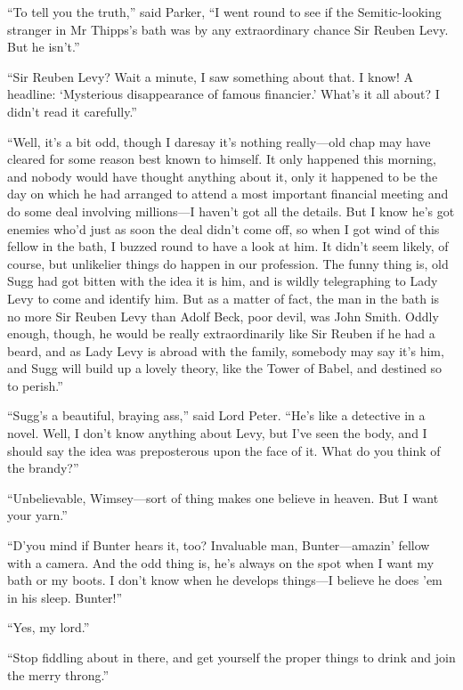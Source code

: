 \enquote{To tell you the truth,} said Parker, \enquote{I went round to see if the Semitic-looking stranger in Mr Thipps’s bath was by any extraordinary chance Sir Reuben Levy. But he isn’t.}

\enquote{Sir Reuben Levy? Wait a minute, I saw something about that. I know! A headline: \enquote{Mysterious disappearance of famous financier.} What’s it all about? I didn’t read it carefully.}

\enquote{Well, it’s a bit odd, though I daresay it’s nothing really\allowbreak---\allowbreak old chap may have cleared for some reason best known to himself. It only happened this morning, and nobody would have thought anything about it, only it happened to be the day on which he had arranged to attend a most important financial meeting and do some deal involving millions\allowbreak---\allowbreak I haven’t got all the details. But I know he’s got enemies who’d just as soon the deal didn’t come off, so when I got wind of this fellow in the bath, I buzzed round to have a look at him. It didn’t seem likely, of course, but unlikelier things do happen in our profession. The funny thing is, old Sugg had got bitten with the idea it is him, and is wildly telegraphing to Lady Levy to come and identify him. But as a matter of fact, the man in the bath is no more Sir Reuben Levy than Adolf Beck, poor devil, was John Smith. Oddly enough, though, he would be really extraordinarily like Sir Reuben if he had a beard, and as Lady Levy is abroad with the family, somebody may say it’s him, and Sugg will build up a lovely theory, like the Tower of Babel, and destined so to perish.}

\enquote{Sugg’s a beautiful, braying ass,} said Lord Peter. \enquote{He’s like a detective in a novel. Well, I don’t know anything about Levy, but I’ve seen the body, and I should say the idea was preposterous upon the face of it. What do you think of the brandy?}

\enquote{Unbelievable, Wimsey\allowbreak---\allowbreak sort of thing makes one believe in heaven. But I want your yarn.}

\enquote{D’you mind if Bunter hears it, too? Invaluable man, Bunter\allowbreak---\allowbreak amazin’ fellow with a camera. And the odd thing is, he’s always on the spot when I want my bath or my boots. I don’t know when he develops things\allowbreak---\allowbreak I believe he does ’em in his sleep. Bunter!}

\enquote{Yes, my lord.}

\enquote{Stop fiddling about in there, and get yourself the proper things to drink and join the merry throng.}

